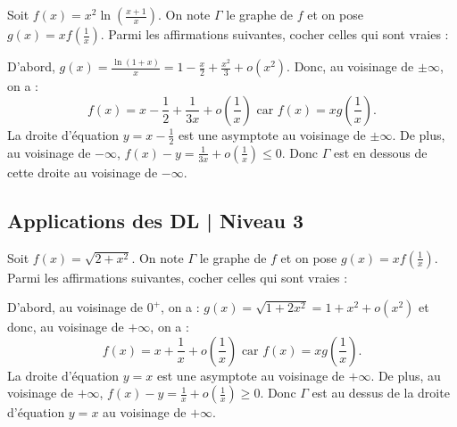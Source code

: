 \begin{question}
Soit $\displaystyle f(x)=x^2\ln \left(\frac{x+1}{x}\right)$. On note $\Gamma$ le graphe de $f$ et on pose $\displaystyle g(x)=xf\left(\frac{1}{x}\right)$. Parmi les affirmations suivantes, cocher celles qui sont vraies :
\begin{answers}  
\end{answers}
\begin{explanations}
D'abord, $\displaystyle g(x)=\frac{\ln (1+x)}{x}=1-\frac{x}{2}+\frac{x^2}{3}+o(x^2)$. Donc, au voisinage de $\pm\infty$, on a :
$$f(x)=x-\frac{1}{2}+\frac{1}{3x}+o\left(\frac{1}{x}\right)\mbox{ car }f(x)=xg\left(\frac{1}{x}\right).$$
La droite d'équation $\displaystyle y=x-\frac{1}{2}$ est une asymptote au voisinage de $\pm\infty$. De plus, au voisinage de $-\infty$, $\displaystyle f(x)-y=\frac{1}{3x}+o\left(\frac{1}{x}\right)\leq 0$. Donc $\Gamma$ est en dessous de cette droite au voisinage de $-\infty$.
\end{explanations}
\end{question}


\subsection{Applications des DL | Niveau 3}


\begin{question}
Soit $\displaystyle f(x)=\sqrt{2+x^2}$. On note $\Gamma$ le graphe de $f$ et on pose $\displaystyle g(x)=xf\left(\frac{1}{x}\right)$. Parmi les affirmations suivantes, cocher celles qui sont vraies :
\begin{answers}  
\end{answers}
\begin{explanations}
D'abord, au voisinage de $0^+$, on a : $g(x)=\sqrt{1+2x^2}=1+x^2+o(x^2)$ et donc, au voisinage de $+\infty$, on a :
$$f(x)=x+\frac{1}{x}+o\left(\frac{1}{x}\right)\mbox{ car }f(x)=xg\left(\frac{1}{x}\right).$$
La droite d'équation $y=x$ est une asymptote au voisinage de $+\infty$. De plus, au voisinage de $+\infty$, $\displaystyle f(x)-y=\frac{1}{x}+o\left(\frac{1}{x}\right)\geq 0$. Donc $\Gamma$ est au dessus de la droite d'équation $y=x$ au voisinage de $+\infty$.
\end{explanations}
\end{question}


